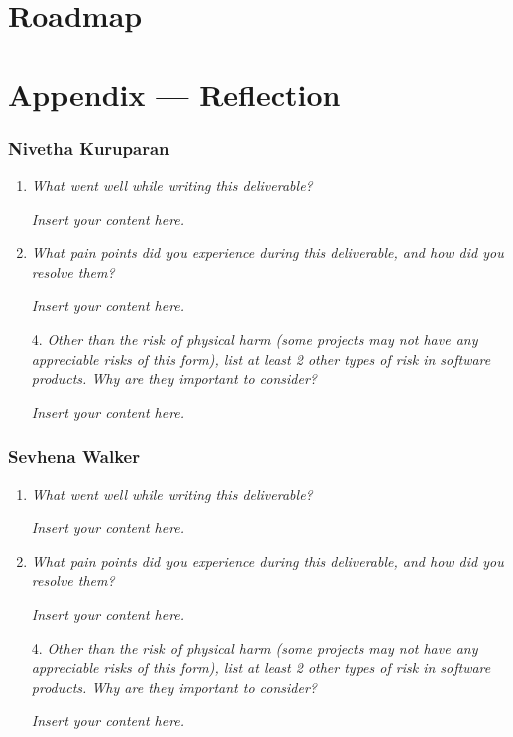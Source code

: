 \documentclass{article}
\newcommand{\lips}{\textit{Insert your content here.}}
\begin{document}

\section{Roadmap}


\newpage{}

\section*{Appendix --- Reflection}

\subsubsection*{Nivetha Kuruparan}

\begin{enumerate}
  \item \textit{What went well while writing this deliverable?}
  
  \lips

  \item \textit{What pain points did you experience during this deliverable, and how did you resolve them?}
  
  \lips
  
  \item[4.] \textit{Other than the risk of physical harm (some projects may not have any appreciable risks of this form),
  list at least 2 other types of risk in software products. Why are they important to consider?}

  \lips

\end{enumerate}

\subsubsection*{Sevhena Walker}

\begin{enumerate}
  \item \textit{What went well while writing this deliverable?}
  
  \lips

  \item \textit{What pain points did you experience during this deliverable, and how did you resolve them?}
  
  \lips
  
  \item[4.] \textit{Other than the risk of physical harm (some projects may not have any appreciable risks of this form),
  list at least 2 other types of risk in software products. Why are they important to consider?}

  \lips

\end{enumerate}
\end{document}
